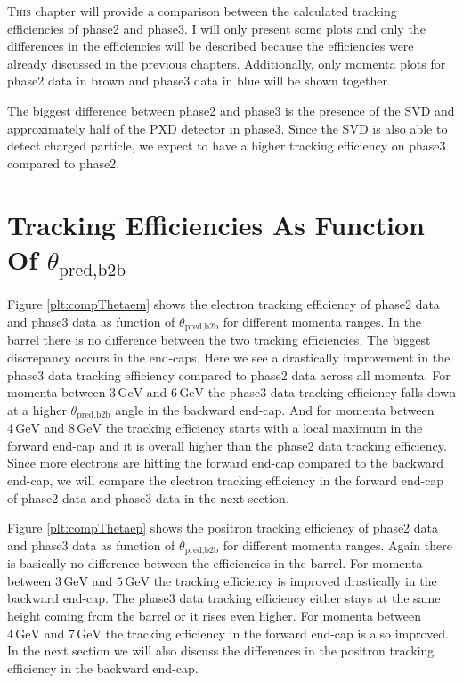 \documentclass[a4paper,11pt,twosided,final,german,openbib,pdftex,listof=totoc,bibliography=totoc]{scrbook}
\begin{document}
\lettrine{T}{his} chapter will provide a comparison between the calculated tracking efficiencies of phase2 and phase3. I will only present some plots and only the differences in the efficiencies will be described because the efficiencies were already discussed in the previous chapters. Additionally, only momenta plots for phase2 data in brown and phase3 data in blue will be shown together.
\newline

The biggest difference between phase2 and phase3 is the presence of the SVD and approximately half of the PXD detector in phase3.
Since the SVD is also able to detect charged particle, we expect to have a higher tracking efficiency on phase3 compared to phase2.

\section{Tracking Efficiencies As Function Of $\theta_{\textrm{pred,b2b}}$}


Figure \ref{plt:compThetaem} shows the electron tracking efficiency of phase2 data and phase3 data as function of $\theta_{\textrm{pred,b2b}}$ for different momenta ranges. In the barrel there is no difference between the two tracking efficiencies. The biggest discrepancy occurs in the end-caps. Here we see a drastically improvement in the phase3 data tracking efficiency compared to phase2 data across all momenta. 
For momenta between $3\,\textrm{GeV}$ and $6\,\textrm{GeV}$ the phase3 data tracking efficiency falls down at a higher $\theta_{\textrm{pred,b2b}}$ angle in the backward end-cap. 
And for momenta between $4\,\textrm{GeV}$ and $8\,\textrm{GeV}$ the tracking efficiency starts with a local maximum in the forward end-cap and it is overall higher than the phase2 data tracking efficiency. Since more electrons are hitting the forward end-cap compared to the backward end-cap, we will compare the electron tracking efficiency in the forward end-cap of phase2 data and phase3 data in the next section. 


Figure \ref{plt:compThetaep} shows the positron tracking efficiency of phase2 data and phase3 data as function of $\theta_{\textrm{pred,b2b}}$ for different momenta ranges. Again there is basically no difference between the efficiencies in the barrel. 
For momenta between $3\,\textrm{GeV}$ and $5\,\textrm{GeV}$ the tracking efficiency is improved drastically in the backward end-cap. The phase3 data tracking efficiency either stays at the same height coming from the barrel or it rises even higher. 
For momenta between $4\,\textrm{GeV}$ and $7\,\textrm{GeV}$ the tracking efficiency in the forward end-cap is also improved. In the next section we will also discuss the differences in the positron tracking efficiency in the backward end-cap.
\end{document}
